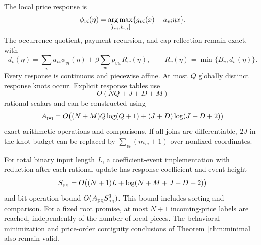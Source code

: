 \begin{theorem}\label{thm:r33-pq}
The local price response is
\[
 \phi_{vi}(\eta)=\operatorname*{arg\,max}_{[l_{vi},h_{vi}]}\{g_{vi}(x)-a_{vi}\eta x\}.
\]
The occurrence quotient, payment recursion, and cap reflection remain exact, with
\begin{equation}\label{eq:r33-pq-recursion}
 d_v(\eta)=\sum_i a_{vi}\phi_{vi}(\eta)+\beta\sum_wp_{vw}R_w(\eta),
 \qquad R_v(\eta)=\min\{B_v,d_v(\eta)\}.
\end{equation}
Every response is continuous and piecewise affine. At most $Q$ globally distinct response knots occur. Explicit response tables use
\[
 O(NQ+J+D+M)
\]
rational scalars and can be constructed using
\begin{equation}\label{eq:r33-operations}
 A_{\rm pq}=O\bigl((N+M)Q\log(Q+1)+(J+D)\log(J+D+2)\bigr)
\end{equation}
exact arithmetic operations and comparisons. If all joins are differentiable, $2J$ in the knot budget can be replaced by $\sum_{vi}(m_{vi}+1)$ over nonfixed coordinates.

For total binary input length $L$, a coefficient-event implementation with reduction after each rational update has response-coefficient and event height
\[
 S_{\rm pq}=O\bigl((N+1)L+\log(N+M+J+D+2)\bigr)
\]
and bit-operation bound $O(A_{\rm pq}S_{\rm pq}^3)$. This bound includes sorting and comparison. For a fixed root promise, at most $N+1$ incoming-price labels are reached, independently of the number of local pieces. The behavioral minimization and price-order contiguity conclusions of Theorem~\ref{thm:minimal} also remain valid.
\end{theorem}
